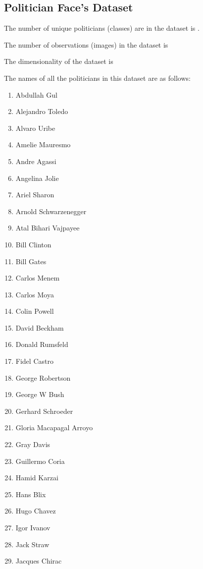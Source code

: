 \documentclass[12pt]{article}
\begin{document}
\subsection{Politician Face's Dataset} \label{sec:politiciansfaces}

The number of unique politicians (classes) are in the dataset is .

The number of observations (images) in the dataset is 

The dimensionality of the dataset is 

The names of all the politicians in this dataset are as follows:
\begin{multicols}{3}
\begin{enumerate}[itemsep=0pt]
    \item Abdullah Gul
    \item Alejandro Toledo
    \item Alvaro Uribe
    \item Amelie Mauresmo
    \item Andre Agassi
    \item Angelina Jolie
    \item Ariel Sharon
    \item Arnold Schwarzenegger
    \item Atal Bihari Vajpayee
    \item Bill Clinton
    \item Bill Gates
    \item Carlos Menem
    \item Carlos Moya
    \item Colin Powell
    \item David Beckham
    \item Donald Rumsfeld
    \item Fidel Castro
    \item George Robertson
    \item George W Bush
    \item Gerhard Schroeder
    \item Gloria Macapagal Arroyo
    \item Gray Davis
    \item Guillermo Coria
    \item Hamid Karzai
    \item Hans Blix
    \item Hugo Chavez
    \item Igor Ivanov
    \item Jack Straw
    \item Jacques Chirac

\end{enumerate}
\end{multicols}
\end{document}
